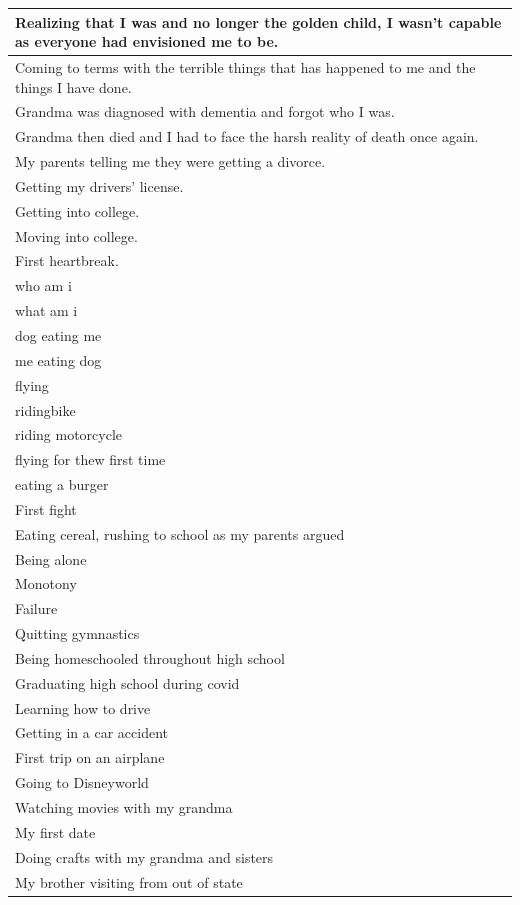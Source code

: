 \documentclass[
  .7em,
  letterpaper,
  DIV=11,
  numbers=noendperiod]{scrartcl}
\begin{document}
\begin{table}
\begin{tabular}{l}
\hline
Realizing that I was and no longer the golden child, I wasn't capable as everyone had envisioned me to be.\\
\hline
Coming to terms with the terrible things that has happened to me and the things I have done.\\
\hline
Grandma was diagnosed with dementia and forgot who I was.\\
\hline
Grandma then died and I had to face the harsh reality of death once again.\\
\hline
My parents telling me they were getting a divorce.\\
\hline
Getting my drivers' license.\\
\hline
Getting into college.\\
\hline
Moving into college.\\
\hline
First heartbreak.\\
\hline
who am i\\
\hline
what am i\\
\hline
dog eating me\\
\hline
me eating dog\\
\hline
flying\\
\hline
ridingbike\\
\hline
riding motorcycle\\
\hline
flying for thew first time\\
\hline
eating a burger\\
\hline
First fight\\
\hline
Eating cereal, rushing to school as my parents argued\\
\hline
Being alone\\
\hline
Monotony\\
\hline
Failure\\
\hline
Quitting gymnastics\\
\hline
Being homeschooled throughout high school\\
\hline
Graduating high school during covid\\
\hline
Learning how to drive\\
\hline
Getting in a car accident\\
\hline
First trip on an airplane\\
\hline
Going to Disneyworld\\
\hline
Watching movies with my grandma\\
\hline
My first date\\
\hline
Doing crafts with my grandma and sisters\\
\hline
My brother visiting from out of state\\

\end{tabular}
\end{table}
\end{document}
